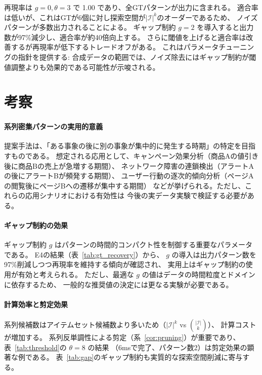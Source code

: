 \documentclass[11pt,a4paper]{article}
\begin{document}
再現率は $g=0, \theta=3$ で 1.00 であり、全GTパターンが出力に含まれる。
適合率は低いが、これはGTが6個に対し探索空間が$|\mathcal{I}|^k$のオーダーであるため、
ノイズパターンが多数出力されることによる。
ギャップ制約 $g=2$ を導入すると出力数が97\%減少し、適合率が約40倍向上する。
さらに閾値を上げると適合率は改善するが再現率が低下するトレードオフがある。
これはパラメータチューニングの指針を提供する:
合成データの範囲では、ノイズ除去にはギャップ制約が閾値調整よりも効果的である可能性が示唆される。

\section{考察}
\label{sec:discussion}

\paragraph{系列密集パターンの実用的意義}
提案手法は、「ある事象の後に別の事象が集中的に発生する時期」の特定を目指すものである。
想定される応用として、キャンペーン効果分析（商品Aの値引き後に商品Bの売上が急増する期間）、
ネットワーク障害の連鎖検出（アラートAの後にアラートBが頻発する期間）、
ユーザー行動の逐次的傾向分析（ページAの閲覧後にページBへの遷移が集中する期間）
などが挙げられる。ただし、これらの応用シナリオにおける有効性は
今後の実データ実験で検証する必要がある。

\paragraph{ギャップ制約の効果}
ギャップ制約 $g$ はパターンの時間的コンパクト性を制御する重要なパラメータである。
E4の結果（表~\ref{tab:gt_recovery}）から、
$g$ の導入は出力パターン数を97\%削減しつつ再現率を維持する傾向が確認され、
実用上はギャップ制約の使用が有効と考えられる。
ただし、最適な $g$ の値はデータの時間粒度とドメインに依存するため、
一般的な推奨値の決定には更なる実験が必要である。

\paragraph{計算効率と剪定効果}
系列候補数はアイテムセット候補数より多いため（$|\mathcal{I}|^k$ vs $\binom{|\mathcal{I}|}{k}$）、
計算コストが増加する。
系列反単調性による剪定（系~\ref{cor:pruning}）が重要であり、
表~\ref{tab:threshold}の $\theta=8$ の結果
（6msで完了、パターン数2）は剪定効果の顕著な例である。
表~\ref{tab:gap}のギャップ制約も実質的な探索空間削減に寄与する。
\end{document}
